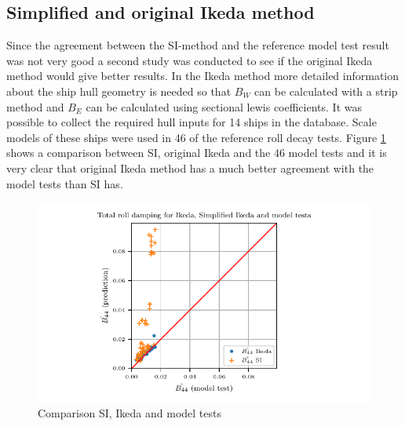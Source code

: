 \subsection{Simplified and original Ikeda method}
\label{se:si_ikeda_model}
Since the agreement between the SI-method and the reference model test result was not very good a second study was conducted to see if the original Ikeda method would give better results. In the Ikeda method more detailed information about the ship hull geometry is needed so that $B_W$ can be calculated with a strip method and $B_E$ can be calculated using sectional lewis coefficients. It was possible to collect the required hull inputs for 14 ships in the database. Scale models of these ships were used in 46 of the reference roll decay tests.
Figure \ref{fig:si_ikeda_model} shows a comparison between SI, original Ikeda and the 46 model tests and it is very clear that original Ikeda method has a much better agreement with the model tests than SI has.  

\begin{figure}[H]
    \centering
    \includegraphics[]{figures/si_ikeda_model.pdf}
        \vspace{-0.5cm}
    \caption{Comparison SI, Ikeda and model tests}
    \label{fig:si_ikeda_model}
\end{figure}
